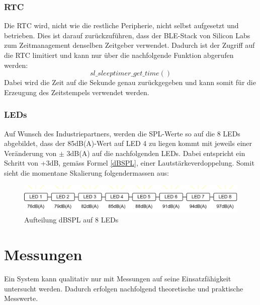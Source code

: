 \documentclass[12pt]{article}
\begin{document}
	\subsubsection*{RTC}
	Die RTC wird, nicht wie die restliche Peripherie, nicht selbst aufgesetzt und betrieben. Dies ist darauf zurückzuführen, dass der BLE-Stack von Silicon Labs zum Zeitmanagement denselben Zeitgeber verwendet. Dadurch ist der Zugriff auf die RTC limitiert und kann nur über die nachfolgende Funktion abgerufen werden:
	$$ sl\_sleeptimer\_get\_time() $$
	Dabei wird die Zeit auf die Sekunde genau zurückgegeben und kann somit für die Erzeugung des Zeitstempels verwendet werden.
	\subsubsection*{LEDs}
	Auf Wunsch des Industriepartners, werden die SPL-Werte so auf die 8 LEDs abgebildet, dass der 85dB(A)-Wert auf LED 4 zu liegen kommt mit jeweils einer Veränderung von $\pm$ 3dB(A) auf die nachfolgenden LEDs. Dabei entspricht ein Schritt von +3dB, gemäss Formel \ref{dBSPL}, einer Lautstärkeverdoppelung. Somit sieht die momentane Skalierung folgendermassen aus:
	\begin{figure}[H]
		\centering
		\includegraphics[width=1\linewidth]{images/BAT_Skalierung-SPL-auf-LED}
		\caption{Aufteilung dBSPL auf 8 LEDs}
		\label{fig:batskalierung-spl-auf-led}
	\end{figure}
	
	
	\newpage
	\section{Messungen}\label{Messungen}
	Ein System kann qualitativ nur mit Messungen auf seine Einsatzfähigkeit untersucht werden. Dadurch erfolgen nachfolgend theoretische und praktische Messwerte.
\end{document}

